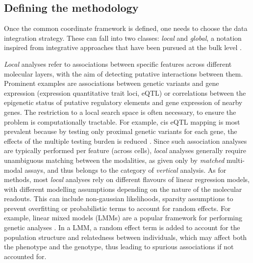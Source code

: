 \subsection{Defining the methodology}

Once the common coordinate framework is defined, one needs to choose the data integration strategy. These can fall into two classes: \textit{local} and \textit{global}, a notation inspired from integrative approaches that have been pursued at the bulk level \cite{Ritchie2015}. 

\textit{Local} analyses refer to associations between specific features across different molecular layers, with the aim of detecting putative interactions between them. Prominent examples are associations between genetic variants and gene expression (expression quantitative trait loci, eQTL) or correlations between the epigenetic status of putative regulatory elements and gene expression of nearby genes. The restriction to a local search space is often necessary, to ensure the problem is computationally tractable. For example, cis eQTL mapping is most prevalent because by testing only proximal genetic variants for each gene, the effects of the multiple testing burden is reduced \cite{Nica2013}. Since such association analyses are typically performed per feature (across cells), \textit{local} analyses generally require unambiguous matching between the modalities, as given only by \textit{matched} multi-modal assays, and thus belongs to the category of \textit{vertical} analysis. As for methods, most \textit{local} analyses rely on different flavours of linear regression models, with different modelling assumptions depending on the nature of the molecular readouts. This can include non-gaussian likelihoods, sparsity assumptions to prevent overfitting or probabilistic terms to account for random effects. For example, linear mixed models (LMMs) are a popular framework for performing genetic analyses \cite{Moore2019}. In a LMM, a random effect term is added to account for the population structure and relatedness between individuals, which may affect both the phenotype and the genotype, thus leading to spurious associations if not accounted for.

